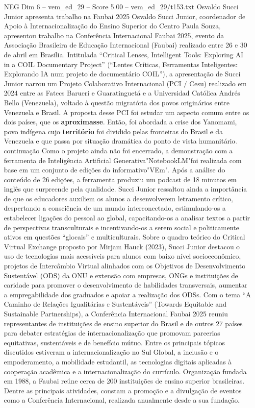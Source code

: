 \begin{textsample}{NEG Dim 6 – vem\_ed\_29 – Score 5.00 – vem\_ed\_29/t153.txt}  \label{ex:f6_neg_160}
Osvaldo Succi Junior apresenta trabalho na Faubai 2025 Osvaldo Succi Junior, coordenador de Apoio à Internacionalização do Ensino Superior do Centro Paula Souza, apresentou trabalho na Conferência Internacional Faubai 2025, evento da Associação Brasileira de Educação Internacional (Faubai) realizado entre 26 e 30 de abril em Brasília.
Intitulada “Critical Lenses, Intelligent Tools: Exploring AI in a COIL Documentary Project” (“Lentes Críticas, Ferramentas Inteligentes: Explorando IA num projeto de documentário COIL”), a apresentação de Succi Junior narrou um Projeto Colaborativo Internacional (PCI / Cesu) realizado em 2024 entre as Fatecs Barueri e Guaratinguetá e a Universidad Católica Andrés Bello (Venezuela), voltado à questão migratória dos povos originários entre Venezuela e Brasil.
A proposta desse PCI foi estudar um aspecto comum entre os dois países, que os \textbf{aproximasse}.
Então, foi abordada a crise dos Yanomami, povo indígena cujo \textbf{território} foi dividido pelas fronteiras do Brasil e da Venezuela e que passa por situação dramática do ponto de vista humanitário. continuação Como o projeto ainda não foi encerrado, a demonstração com a ferramenta de Inteligência Artificial Generativa"NotebookLM"foi realizada com base em um conjunto de edições do informativo"VEm".
Após a análise do conteúdo de 26 edições, a ferramenta produziu um podcast de 18 minutos em inglês que surpreende pela qualidade.
Succi Junior ressaltou ainda a importância de que os educadores auxiliem os alunos a desenvolverem letramento crítico, despertando a consciência de um mundo interconectado, estimulando-os a estabelecer ligações do pessoal ao global, capacitando-os a analisar textos a partir de perspectivas transculturais e incentivando-os a serem social e politicamente ativos em questões “glocais” e multiculturais.
Sobre o quadro teórico do Critical Virtual Exchange proposto por Mirjam Hauck (2023), Succi Junior destacou o uso de tecnologias mais acessíveis para alunos com baixo nível socioeconômico, projetos de Intercâmbio Virtual alinhados com os Objetivos de Desenvolvimento Sustentável (ODS) da ONU e extensão com empresas, ONGs e instituições de caridade para promover o desenvolvimento de habilidades transversais, aumentar a empregabilidade dos graduados e apoiar a realização dos ODSs.
Com o tema “A Caminho de Relações Igualitárias e Sustentáveis” (Towards Equitable and Sustainable Partnerships), a Conferência Internacional Faubai 2025 reuniu representantes de instituições de ensino superior do Brasil e de outros 27 países para debater estratégias de internacionalização que promovam parcerias equitativas, sustentáveis e de benefício mútuo.
Entre os principais tópicos discutidos estiveram a internacionalização no Sul Global, a inclusão e o empoderamento, a mobilidade estudantil, as tecnologias digitais aplicadas à cooperação acadêmica e a internacionalização do currículo.
Organização fundada em 1988, a Faubai reúne cerca de 200 instituições de ensino superior brasileiras.
Dentre as principais atividades, constam a promoção e a divulgação de eventos como a Conferência Internacional, realizada anualmente desde a sua fundação.

\end{textsample}
